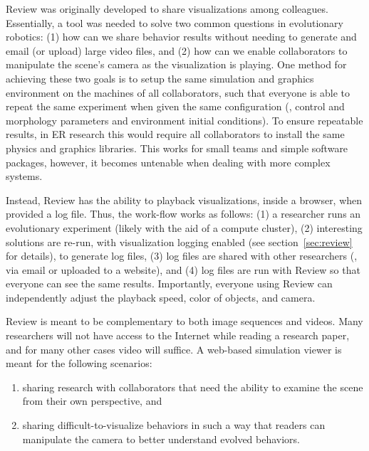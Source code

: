Review was originally developed to share visualizations among colleagues.
%
Essentially, a tool was needed to solve two common questions in evolutionary robotics: (1) how can we share behavior results without needing to generate and email (or upload) large video files, and (2) how can we enable collaborators to manipulate the scene's camera as the visualization is playing.
%
One method for achieving these two goals is to setup the same simulation and graphics environment on the machines of all collaborators, such that everyone is able to repeat the same experiment when given the same configuration (\ie{}, control and morphology parameters and environment initial conditions).
%
To ensure repeatable results, in ER research this would require all collaborators to install the same physics and graphics libraries.
%
This works for small teams and simple software packages, however, it becomes untenable when dealing with more complex systems.




Instead, Review has the ability to playback visualizations, inside a browser, when provided a log file.
%
Thus, the work-flow works as follows: (1) a researcher runs an evolutionary experiment (likely with the aid of a compute cluster), (2) interesting solutions are re-run, with visualization logging enabled (see section~\ref{sec:review} for details), to generate log files, (3) log files are shared with other researchers (\eg{}, via email or uploaded to a website), and (4) log files are run with Review so that everyone can see the same results.
%
Importantly, everyone using Review can independently adjust the playback speed, color of objects, and camera.



Review is meant to be complementary to both image sequences and videos.
%
Many researchers will not have access to the Internet while reading a research paper, and for many other cases video will suffice.
%
A web-based simulation viewer is meant for the following scenarios:

\begin{enumerate}
    \item sharing research with collaborators that need the ability to examine the scene from their own perspective, and
    \item sharing difficult-to-visualize behaviors in such a way that readers can manipulate the camera to better understand evolved behaviors.
\end{enumerate}
